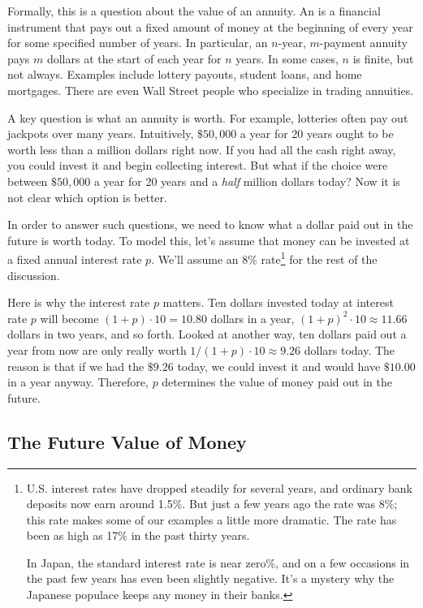 Formally, this is a question about the value of an annuity.  An
 is a financial instrument that pays out a fixed amount of
money at the beginning of every year for some specified number of years.
In particular, an $n$-year, $m$-payment annuity pays $m$ dollars at the
start of each year for $n$ years.  In some cases, $n$ is finite, but not
always.  Examples include lottery payouts, student loans, and home
mortgages.  There are even Wall Street people who specialize in trading
annuities.

A key question is what an annuity is worth.  For example, lotteries often
pay out jackpots over many years.  Intuitively, $\$50,000$ a year for 20
years ought to be worth less than a million dollars right now.  If you had
all the cash right away, you could invest it and begin collecting
interest.  But what if the choice were between $\$50,000$ a year for 20
years and a \emph{half} million dollars today?  Now it is not clear which
option is better.

In order to answer such questions, we need to know what a dollar paid out
in the future is worth today.  To model this, let's assume that money can
be invested at a fixed annual interest rate $p$.  We'll assume an 8\%
rate\footnote{U.S. interest rates have dropped steadily for several years,
  and ordinary bank deposits now earn around 1.5\%.  But just a few years
  ago the rate was 8\%; this rate makes some of our examples a little more
  dramatic.  The rate has been as high as 17\% in the past thirty
  years.

  In Japan, the standard interest rate is near zero\%, and on a few
  occasions in the past few years has even been slightly negative.  It's a
  mystery why the Japanese populace keeps any money in their banks.}  for
the rest of the discussion.

Here is why the interest rate $p$ matters.  Ten dollars invested today
at interest rate $p$ will become $(1+p)\cdot 10 = 10.80$ dollars in a
year, $(1+p)^2\cdot 10 \approx 11.66$ dollars in two years, and so
forth.  Looked at another way, ten dollars paid out a year from now
are only really worth $1/(1+p) \cdot 10 \approx 9.26$ dollars today.
The reason is that if we had the $\$9.26$ today, we could invest it
and would have $\$10.00$ in a year anyway.  Therefore, $p$ determines
the value of money paid out in the future. 

\subsection{The Future Value of Money}

